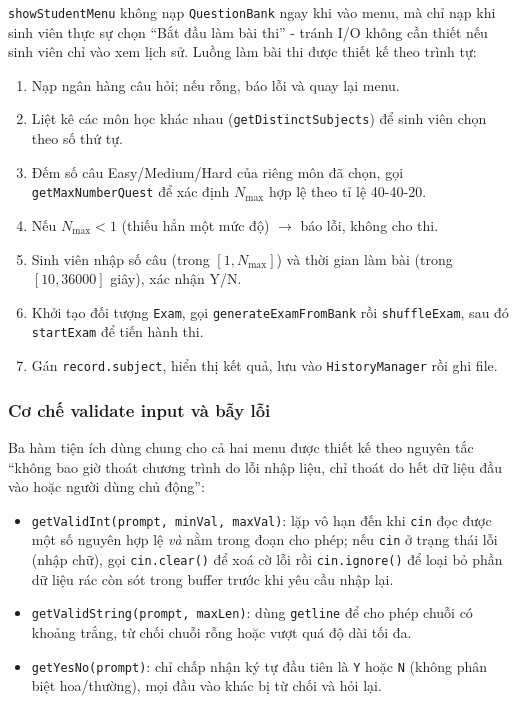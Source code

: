 \documentclass[11pt]{report}
\begin{document}
\texttt{showStudentMenu} không nạp \texttt{QuestionBank} ngay khi vào menu, mà chỉ nạp khi sinh viên thực sự chọn ``Bắt đầu làm bài thi'' - tránh I/O không cần thiết nếu sinh viên chỉ vào xem lịch sử. Luồng làm bài thi được thiết kế theo trình tự:

\begin{enumerate}[leftmargin=*, label=\arabic*.]
    \item Nạp ngân hàng câu hỏi; nếu rỗng, báo lỗi và quay lại menu.
    \item Liệt kê các môn học khác nhau (\texttt{getDistinctSubjects}) để sinh viên chọn theo số thứ tự.
    \item Đếm số câu Easy/Medium/Hard của riêng môn đã chọn, gọi \texttt{getMaxNumberQuest} để xác định $N_{\max}$ hợp lệ theo tỉ lệ 40-40-20.
    \item Nếu $N_{\max} < 1$ (thiếu hẳn một mức độ) $\to$ báo lỗi, không cho thi.
    \item Sinh viên nhập số câu (trong $[1, N_{\max}]$) và thời gian làm bài (trong $[10, 36000]$ giây), xác nhận Y/N.
    \item Khởi tạo đối tượng \texttt{Exam}, gọi \texttt{generateExamFromBank} rồi \texttt{shuffleExam}, sau đó \texttt{startExam} để tiến hành thi.
    \item Gán \texttt{record.subject}, hiển thị kết quả, lưu vào \texttt{HistoryManager} rồi ghi file.
\end{enumerate}

\subsubsection{Cơ chế validate input và bẫy lỗi}

Ba hàm tiện ích dùng chung cho cả hai menu được thiết kế theo nguyên tắc ``không bao giờ thoát chương trình do lỗi nhập liệu, chỉ thoát do hết dữ liệu đầu vào hoặc người dùng chủ động'':

\begin{itemize}[leftmargin=*]
    \item \texttt{getValidInt(prompt, minVal, maxVal)}: lặp vô hạn đến khi \texttt{cin} đọc được một số nguyên hợp lệ \textit{và} nằm trong đoạn cho phép; nếu \texttt{cin} ở trạng thái lỗi (nhập chữ), gọi \texttt{cin.clear()} để xoá cờ lỗi rồi \texttt{cin.ignore()} để loại bỏ phần dữ liệu rác còn sót trong buffer trước khi yêu cầu nhập lại.
    \item \texttt{getValidString(prompt, maxLen)}: dùng \texttt{getline} để cho phép chuỗi có khoảng trắng, từ chối chuỗi rỗng hoặc vượt quá độ dài tối đa.
    \item \texttt{getYesNo(prompt)}: chỉ chấp nhận ký tự đầu tiên là \texttt{Y} hoặc \texttt{N} (không phân biệt hoa/thường), mọi đầu vào khác bị từ chối và hỏi lại.
\end{itemize}
\end{document}
